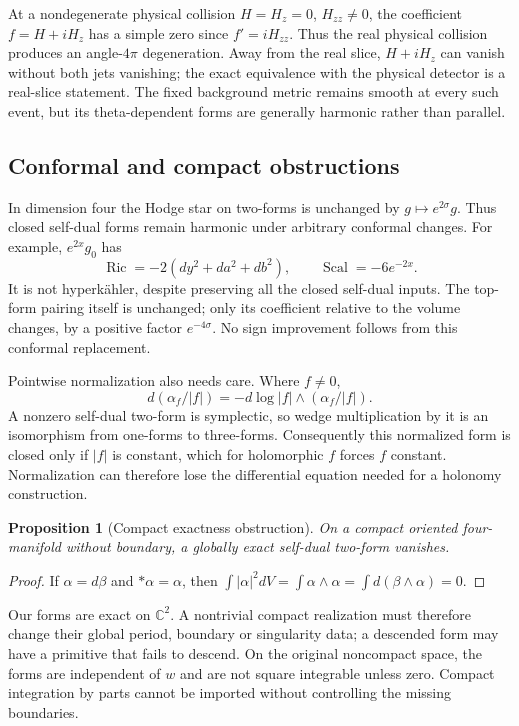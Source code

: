 \documentclass[11pt]{article}
\numberwithin{equation}{section}
\newtheorem{proposition}[theorem]{Proposition}
\theoremstyle{definition}
\theoremstyle{remark}
\begin{document}
At a nondegenerate physical collision $H=H_z=0$, $H_{zz}\ne0$, the
coefficient $f=H+iH_z$ has a simple zero since $f'=iH_{zz}$.  Thus the
real physical collision produces an angle-$4\pi$ degeneration.
Away from the real slice, $H+iH_z$ can vanish without both jets
vanishing; the exact equivalence with the physical detector is a
real-slice statement.  The fixed background metric remains smooth at
every such event, but its theta-dependent forms are generally harmonic
rather than parallel.

\subsection{Conformal and compact obstructions}
In dimension four the Hodge star on two-forms is unchanged by
$g\mapsto e^{2\sigma}g$.  Thus closed self-dual forms remain harmonic
under arbitrary conformal changes.  For example, $e^{2x}g_0$ has
\[
 \operatorname{Ric}=-2(dy^2+da^2+db^2),\qquad
 \operatorname{Scal}=-6e^{-2x}.
\]
It is not hyperk\"ahler, despite preserving all the closed self-dual
inputs.  The top-form pairing itself is unchanged; only its coefficient
relative to the volume changes, by a positive factor $e^{-4\sigma}$.
No sign improvement follows from this conformal replacement.

Pointwise normalization also needs care.  Where $f\ne0$,
\[
 d(\alpha_f/|f|)=-d\log|f|\wedge(\alpha_f/|f|).
\]
A nonzero self-dual two-form is symplectic, so wedge multiplication by
it is an isomorphism from one-forms to three-forms.  Consequently this
normalized form is closed only if $|f|$ is constant, which for
holomorphic $f$ forces $f$ constant.  Normalization can therefore lose
the differential equation needed for a holonomy construction.

\begin{proposition}[Compact exactness obstruction]\label{hk:compact}
On a compact oriented four-manifold without boundary, a globally exact
self-dual two-form vanishes.
\end{proposition}
\begin{proof}
If $\alpha=d\beta$ and $*\alpha=\alpha$, then
$\int |\alpha|^2dV=\int\alpha\wedge\alpha
=\int d(\beta\wedge\alpha)=0$.
\end{proof}
Our forms are exact on $\mathbb C^2$.  A nontrivial compact realization
must therefore change their global period, boundary or singularity
data; a descended form may have a primitive that fails to descend.
On the original noncompact space, the forms are independent of $w$
and are not square integrable unless zero.  Compact integration by
parts cannot be imported without controlling the missing boundaries.
\end{document}
